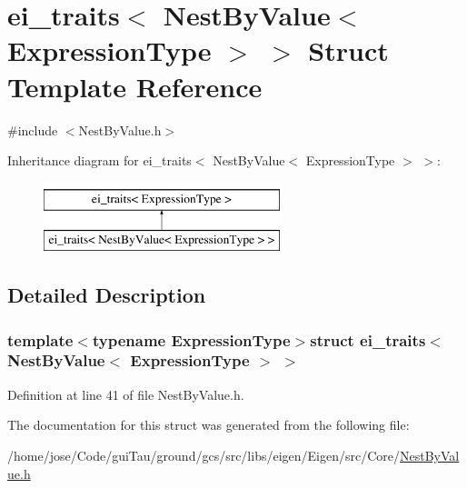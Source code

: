 \hypertarget{structei__traits_3_01_nest_by_value_3_01_expression_type_01_4_01_4}{\section{ei\-\_\-traits$<$ Nest\-By\-Value$<$ Expression\-Type $>$ $>$ Struct Template Reference}
\label{structei__traits_3_01_nest_by_value_3_01_expression_type_01_4_01_4}
}


{\ttfamily \#include $<$Nest\-By\-Value.\-h$>$}

Inheritance diagram for ei\-\_\-traits$<$ Nest\-By\-Value$<$ Expression\-Type $>$ $>$\-:\begin{figure}[H]
\begin{center}
\leavevmode
\includegraphics[height=2.000000cm]{structei__traits_3_01_nest_by_value_3_01_expression_type_01_4_01_4}
\end{center}
\end{figure}


\subsection{Detailed Description}
\subsubsection*{template$<$typename Expression\-Type$>$struct ei\-\_\-traits$<$ Nest\-By\-Value$<$ Expression\-Type $>$ $>$}



Definition at line 41 of file Nest\-By\-Value.\-h.



The documentation for this struct was generated from the following file\-:\begin{DoxyCompactItemize}
\item 
/home/jose/\-Code/gui\-Tau/ground/gcs/src/libs/eigen/\-Eigen/src/\-Core/\hyperlink{_nest_by_value_8h}{Nest\-By\-Value.\-h}\end{DoxyCompactItemize}
